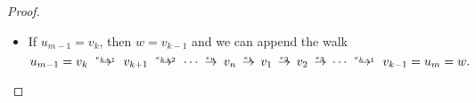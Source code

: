 \begin{proof}
\begin{itemize}
    \begin{figure}[!ht]
      \begin{equation}\label{eq:fig:thm:connected_graph_cycle_removal}
        \begin{aligned}
          \texttt{[image: output/thm\_\_connected\_graph\_cycle\_removal]}
        \end{aligned}
      \end{equation}
      \caption{A detour around the highlighted edge \( e_2 \) as in the proof of }\label{fig:thm:connected_graph_cycle_removal}
    \end{figure}

    \item If \( u_{m-1} = v_k \), then \( w = v_{k-1} \) and we can append the walk
    \begin{equation*}
      u_{m-1} = v_k \reloset {e_{k+1}} \to v_{k+1} \reloset {e_{k+2}} \to \cdots \reloset {e_n} \to v_n \reloset {e_1} \to v_1 \reloset {e_2} \to v_2 \reloset {e_3} \to \cdots \reloset {e_{k-1}} \to v_{k-1} = u_m = w.
    \end{equation*}
  \end{itemize}
\end{proof}

